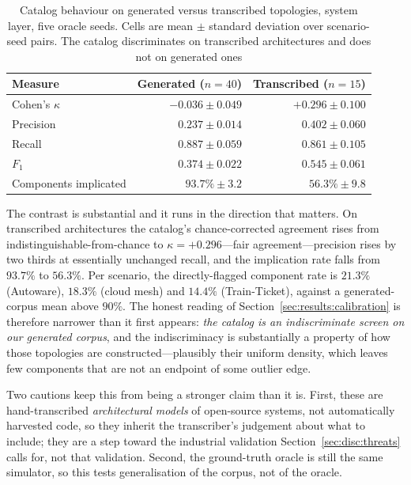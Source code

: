 \begin{table}[htbp]
\centering
\footnotesize
\setlength{\tabcolsep}{4pt}
\caption{Catalog behaviour on generated versus transcribed topologies, system layer, five oracle seeds. Cells are mean $\pm$ standard deviation over scenario-seed pairs. The catalog discriminates on transcribed architectures and does not on generated ones}
\label{tab:realworld}
\begin{tabular}{lrr}
\toprule
\textbf{Measure} & \textbf{Generated} ($n=40$) & \textbf{Transcribed} ($n=15$) \\
\midrule
Cohen's $\kappa$          & $-0.036 \pm 0.049$ & $\mathbf{+0.296 \pm 0.100}$ \\
Precision                 & $0.237 \pm 0.014$  & $\mathbf{0.402 \pm 0.060}$ \\
Recall                    & $0.887 \pm 0.059$  & $0.861 \pm 0.105$ \\
$F_1$                     & $0.374 \pm 0.022$  & $\mathbf{0.545 \pm 0.061}$ \\
Components implicated     & $93.7\% \pm 3.2$   & $\mathbf{56.3\% \pm 9.8}$ \\
\bottomrule
\end{tabular}
\end{table}

The contrast is substantial and it runs in the direction that matters. On transcribed
architectures the catalog's chance-corrected agreement rises from indistinguishable-from-chance to
$\kappa = +0.296$---fair agreement---precision rises by two thirds at essentially unchanged recall,
and the implication rate falls from $93.7\%$ to $56.3\%$. Per scenario, the directly-flagged
component rate is $21.3\%$ (Autoware), $18.3\%$ (cloud mesh) and $14.4\%$ (Train-Ticket), against
a generated-corpus mean above $90\%$. The honest reading of Section~\ref{sec:results:calibration}
is therefore narrower than it first appears: \emph{the catalog is an indiscriminate screen on our
generated corpus}, and the indiscriminacy is substantially a property of how those topologies are
constructed---plausibly their uniform density, which leaves few components that are not an
endpoint of some outlier edge.

Two cautions keep this from being a stronger claim than it is. First, these are hand-transcribed
\emph{architectural models} of open-source systems, not automatically harvested code, so they
inherit the transcriber's judgement about what to include; they are a step toward the industrial
validation Section~\ref{sec:disc:threats} calls for, not that validation. Second, the ground-truth
oracle is still the same simulator, so this tests generalisation of the corpus, not of the oracle.

